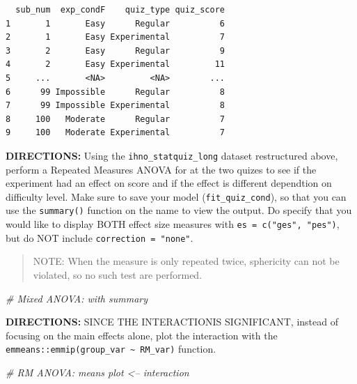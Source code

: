 \documentclass[
]{article}
\newenvironment{Shaded}{\begin{snugshade}}{\end{snugshade}}
\newcommand{\CommentTok}[1]{\textcolor[rgb]{0.56,0.35,0.01}{\textit{#1}}}
\newcommand{\KeywordTok}[1]{\textcolor[rgb]{0.13,0.29,0.53}{\textbf{#1}}}
\newcommand{\NormalTok}[1]{#1}
\newcommand{\OperatorTok}[1]{\textcolor[rgb]{0.81,0.36,0.00}{\textbf{#1}}}
\newcommand{\StringTok}[1]{\textcolor[rgb]{0.31,0.60,0.02}{#1}}
\begin{document}
\begin{Shaded}
\end{Shaded}

\begin{verbatim}
  sub_num  exp_condF    quiz_type quiz_score
1       1       Easy      Regular          6
2       1       Easy Experimental          7
3       2       Easy      Regular          9
4       2       Easy Experimental         11
5     ...       <NA>         <NA>        ...
6      99 Impossible      Regular          8
7      99 Impossible Experimental          8
8     100   Moderate      Regular          7
9     100   Moderate Experimental          7
\end{verbatim}

\textbf{DIRECTIONS:} Using the \texttt{ihno\_statquiz\_long} dataset
restructured above, perform a Repeated Measures ANOVA for at the two
quizes to see if the experiment had an effect on score and if the effect
is different dependtion on difficulty level. Make sure to save your
model (\texttt{fit\_quiz\_cond}), so that you can use the
\texttt{summary()} function on the name to view the output. Do specify
that you would like to display BOTH effect size measures with
\texttt{es\ =\ c("ges",\ "pes")}, but do NOT include
\texttt{correction\ =\ "none"}.

\begin{quote}
NOTE: When the measure is only repeated twice, sphericity can not be
violated, so no such test are performed.
\end{quote}

\begin{Shaded}
\begin{Highlighting}[]
\CommentTok{# Mixed ANOVA:  with summary}
\end{Highlighting}
\end{Shaded}

\clearpage

\textbf{DIRECTIONS:} SINCE THE INTERACTIONIS SIGNIFICANT, instead of
focusing on the main effects alone, plot the interaction with the
\texttt{emmeans::emmip(group\_var\ \textasciitilde{}\ RM\_var)}
function.

\begin{Shaded}
\begin{Highlighting}[]
\CommentTok{# RM ANOVA: means plot <-- interaction}
\end{Highlighting}
\end{Shaded}
\end{document}

